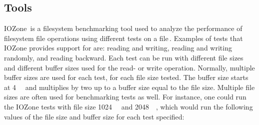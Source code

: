 \subsection{Tools}
IOZone\,\cite{IozoneFilesystemBenchmark} is a filesystem benchmarking tool used to analyze the performance of filesystem file operations using different tests on a file\,\cite{iozoneIozoneFilesystemBenchmark}. Examples of tests that IOZone provides support for are: reading and writing, reading and writing randomly, and reading backward. Each test can be run with different file sizes and different buffer sizes used for the read- or write operation. Normally, multiple buffer sizes are used for each test, for each file size tested. The buffer size starts at \SI{4}{\kilo\byte} and multiplies by two up to a buffer size equal to the file size. Multiple file sizes are often used for benchmarking tests as well. For instance, one could run the IOZone tests with file size \SI{1024}{\kilo\byte} and \SI{2048}{\kilo\byte}, which would run the following values of the file size and buffer size for each test specified:
